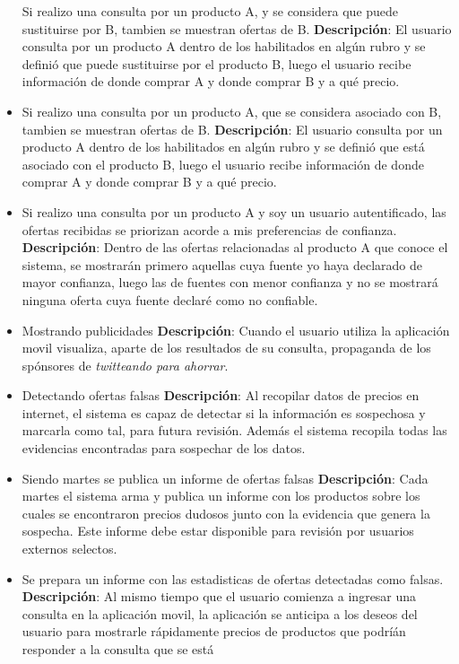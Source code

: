 \begin{itemize}
  Si realizo una consulta por un producto A, y se considera que puede
  sustituirse por B, tambien se muestran ofertas de B.
  \textbf{Descripción}: El usuario consulta por un producto A dentro de
  los habilitados en algún rubro y se definió que puede sustituirse por
  el producto B, luego el usuario recibe información de donde comprar A
  y donde comprar B y a qué precio.
\item
  Si realizo una consulta por un producto A, que se considera asociado
  con B, tambien se muestran ofertas de B. \textbf{Descripción}: El
  usuario consulta por un producto A dentro de los habilitados en algún
  rubro y se definió que está asociado con el producto B, luego el
  usuario recibe información de donde comprar A y donde comprar B y a
  qué precio.
\item
  Si realizo una consulta por un producto A y soy un usuario
  autentificado, las ofertas recibidas se priorizan acorde a mis
  preferencias de confianza. \textbf{Descripción}: Dentro de las ofertas
  relacionadas al producto A que conoce el sistema, se mostrarán primero
  aquellas cuya fuente yo haya declarado de mayor confianza, luego las
  de fuentes con menor confianza y no se mostrará ninguna oferta cuya
  fuente declaré como no confiable.
\item
  Mostrando publicidades \textbf{Descripción}: Cuando el usuario utiliza
  la aplicación movil visualiza, aparte de los resultados de su
  consulta, propaganda de los spónsores de \emph{twitteando para
  ahorrar}.
\item
  Detectando ofertas falsas \textbf{Descripción}: Al recopilar datos de
  precios en internet, el sistema es capaz de detectar si la información
  es sospechosa y marcarla como tal, para futura revisión. Además el
  sistema recopila todas las evidencias encontradas para sospechar de
  los datos.
\item
  Siendo martes se publica un informe de ofertas falsas
  \textbf{Descripción}: Cada martes el sistema arma y publica un informe
  con los productos sobre los cuales se encontraron precios dudosos
  junto con la evidencia que genera la sospecha. Este informe debe estar
  disponible para revisión por usuarios externos selectos.
\item
  Se prepara un informe con las estadisticas de ofertas detectadas como
  falsas. \textbf{Descripción}: Al mismo tiempo que el usuario comienza
  a ingresar una consulta en la aplicación movil, la aplicación se
  anticipa a los deseos del usuario para mostrarle rápidamente precios
  de productos que podríán responder a la consulta que se está

\end{itemize}
